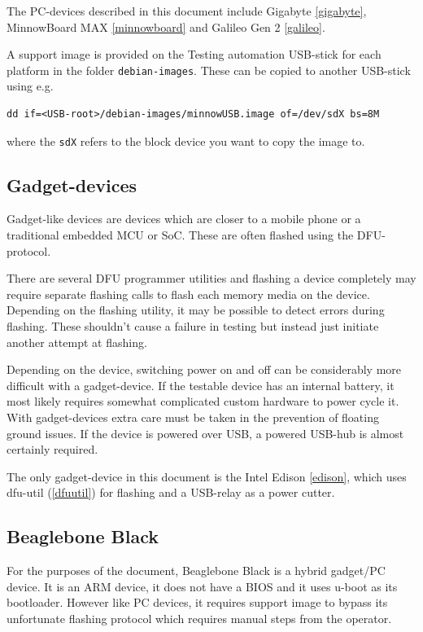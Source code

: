 \documentclass[a4paper,11pt]{article}
\newcommand{\cmd}[1]{\texttt{#1}}
\begin{document}
The PC-devices described in this document include Gigabyte \ref{gigabyte}, MinnowBoard MAX \ref{minnowboard} and Galileo Gen 2 \ref{galileo}. 

A support image is provided on the Testing automation USB-stick for each platform in the folder \cmd{debian-images}. These can be copied to another USB-stick using e.g.
\begin{lstlisting}
dd if=<USB-root>/debian-images/minnowUSB.image of=/dev/sdX bs=8M
\end{lstlisting}
where the \cmd{sdX} refers to the block device you want to copy the image to.

\subsection{Gadget-devices}

Gadget-like devices are devices which are closer to a mobile phone or a traditional embedded MCU or SoC. These are often flashed using the DFU-protocol.

There are several DFU programmer utilities and flashing a device completely may require separate flashing calls to flash each memory media on the device. Depending on the flashing utility, it may be possible to detect errors during flashing. These shouldn't cause a failure in testing but instead just initiate another attempt at flashing.

Depending on the device, switching power on and off can be considerably more difficult with a gadget-device. If the testable device has an internal battery, it most likely requires somewhat complicated custom hardware to power cycle it. With gadget-devices extra care must be taken in the prevention of floating ground issues. If the device is powered over USB, a powered USB-hub is almost certainly required.

The only gadget-device in this document is the Intel Edison \ref{edison}, which uses dfu-util (\ref{dfuutil}) for flashing and a USB-relay as a power cutter.

\subsection{Beaglebone Black}
\label{bbb}

For the purposes of the document, Beaglebone Black is a hybrid gadget/PC device. It is an ARM device, it does not have a BIOS and it uses u-boot as its bootloader. However like PC devices, it requires support image to bypass its unfortunate flashing protocol which requires manual steps from the operator. 
\end{document}
